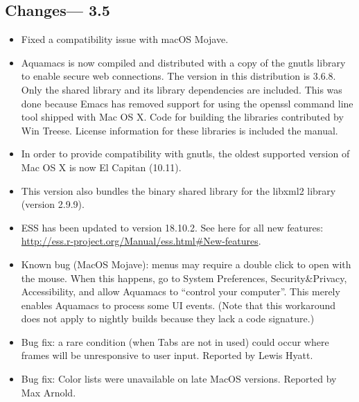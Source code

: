 \subsection{Changes--- 3.5}
\begin{itemize}
\item Fixed a compatibility issue with macOS Mojave.
\item Aquamacs is now compiled and distributed with a copy of the gnutls library to enable secure web connections. The version in this distribution is 3.6.8. Only the shared library  and its library dependencies are included. This was done because Emacs has removed support for using the openssl command line tool shipped with Mac OS X. Code for building the libraries contributed by Win Treese. License information for these libraries is included the manual.
\item In order to provide compatibility with gnutls, the oldest  supported version of Mac OS X is now El Capitan (10.11).

\item This version also bundles the binary shared library for the libxml2 library (version 2.9.9).
\item ESS has been updated to version 18.10.2.  See here for all new features: \url{http://ess.r-project.org/Manual/ess.html#New-features}.

\item Known bug (MacOS Mojave): menus may require a double click to open with
  the mouse.  When this happens, go to System Preferences, Security\&Privacy, Accessibility, and allow Aquamacs to ``control your computer''. This merely enables Aquamacs to process some UI events.  (Note that this workaround does not apply to nightly builds because they lack a code signature.)

\item Bug fix: a rare condition (when Tabs are not in used) could occur where frames will be unresponsive to user input.   Reported by Lewis Hyatt.

\item Bug fix: Color lists were unavailable on late MacOS versions.  Reported by Max Arnold.

\end{itemize}


